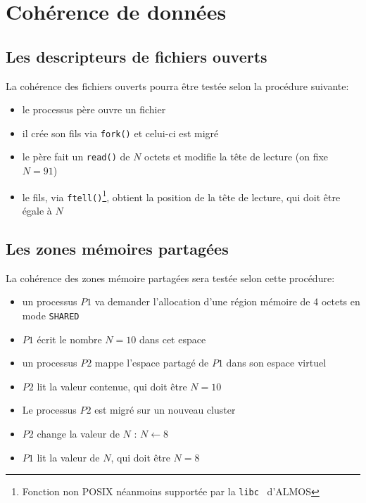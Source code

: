   \section{Cohérence de données}

    \subsection{Les descripteurs de fichiers ouverts}

      La cohérence des fichiers ouverts pourra être testée selon la procédure
      suivante:
      \begin{itemize}
        \item le processus père ouvre un fichier
        \item il crée son fils via \texttt{fork()} et celui-ci est migré
        \item le père fait un \texttt{read()} de $N$ octets et modifie la tête
          de lecture (on fixe $N = 91$)
        \item le fils, via \texttt{ftell()}\footnote{Fonction non POSIX
          néanmoins supportée par la \texttt{libc}~\citep{vonleitner2001diet}
          d'ALMOS}, obtient la position de la tête de lecture, qui doit être
          égale à $N$\\
      \end{itemize}


    \subsection{Les zones mémoires partagées}

      La cohérence des zones mémoire partagées sera testée selon cette
      procédure:
      \begin{itemize}
        \item un processus $P1$ va demander l'allocation d'une région mémoire de
          4 octets en mode \texttt{SHARED}
        \item $P1$ écrit le nombre $N = 10$ dans cet espace
        \item un processus $P2$ mappe l'espace partagé de $P1$ dans son espace
          virtuel
        \item $P2$ lit la valeur contenue, qui doit être $N = 10$
        \item Le processus $P2$ est migré sur un nouveau cluster
        \item $P2$ change la valeur de $N$ : $N\leftarrow 8$
        \item $P1$ lit la valeur de $N$, qui doit être $N = 8$
      \end{itemize}


